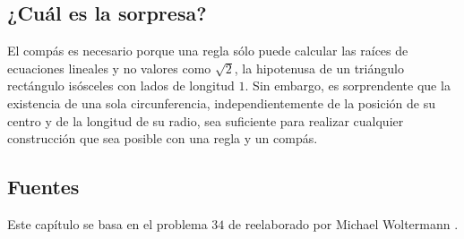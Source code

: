 \subsection*{¿Cuál es la sorpresa?}

El compás es necesario porque una regla sólo puede calcular las raíces de ecuaciones lineales y no valores como $\sqrt{2}$, la hipotenusa de un triángulo rectángulo isósceles con lados de longitud $1$. Sin embargo, es sorprendente que la existencia de una sola circunferencia, independientemente de la posición de su centro y de la longitud de su radio, sea suficiente para realizar cualquier construcción que sea posible con una regla y un compás.

\subsection*{Fuentes}

Este capítulo se basa en el problema $34$ de \cite{dorrie1} reelaborado por Michael Woltermann \cite{dorrie2}.
